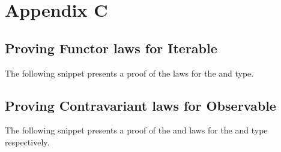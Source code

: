 %
%

\chapter{Appendix C}
\label{app:c}

\section{Proving Functor laws for Iterable}
The following snippet presents a proof of the  laws for the  and  type.


\section{Proving Contravariant laws for Observable}
The following snippet presents a proof of the  and  laws for the  and  type respectively.

